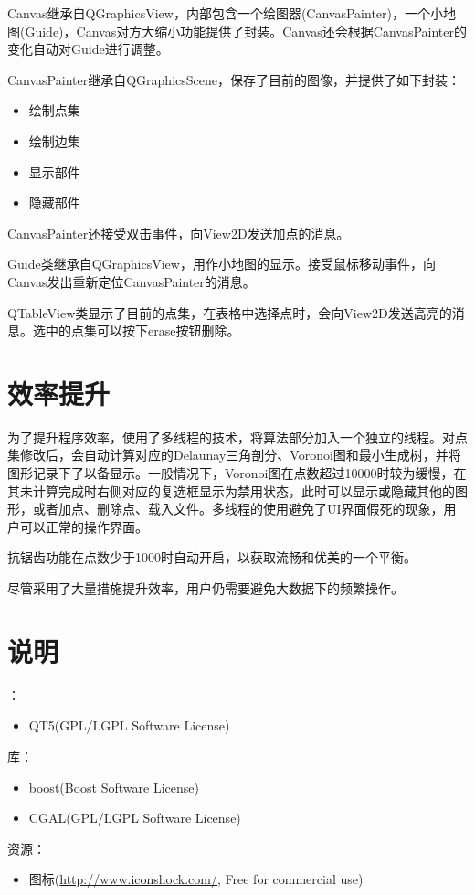 \documentclass[12pt]{article}
\begin{document}
Canvas继承自QGraphicsView，内部包含一个绘图器(CanvasPainter)，一个小地图(Guide)，Canvas对方大缩小功能提供了封装。Canvas还会根据CanvasPainter的变化自动对Guide进行调整。

CanvasPainter继承自QGraphicsScene，保存了目前的图像，并提供了如下封装：
\begin{itemize}
\item 绘制点集
\item 绘制边集
\item 显示部件
\item 隐藏部件
\end{itemize}
CanvasPainter还接受双击事件，向View2D发送加点的消息。

Guide类继承自QGraphicsView，用作小地图的显示。接受鼠标移动事件，向Canvas发出重新定位CanvasPainter的消息。

QTableView类显示了目前的点集，在表格中选择点时，会向View2D发送高亮的消息。选中的点集可以按下erase按钮删除。

\section{效率提升}
为了提升程序效率，使用了多线程的技术，将算法部分加入一个独立的线程。对点集修改后，会自动计算对应的Delaunay三角剖分、Voronoi图和最小生成树，并将图形记录下了以备显示。一般情况下，Voronoi图在点数超过10000时较为缓慢，在其未计算完成时右侧对应的复选框显示为禁用状态，此时可以显示或隐藏其他的图形，或者加点、删除点、载入文件。多线程的使用避免了UI界面假死的现象，用户可以正常的操作界面。

抗锯齿功能在点数少于1000时自动开启，以获取流畅和优美的一个平衡。

尽管采用了大量措施提升效率，用户仍需要避免大数据下的频繁操作。

\section{说明}
：
\begin{itemize}
\item QT5(GPL/LGPL Software License)
\end{itemize}
库：
\begin{itemize}
\item boost(Boost Software License)
\item CGAL(GPL/LGPL Software License)
\end{itemize}
资源：
\begin{itemize}
\item 图标(\href{http://www.iconshock.com/}{http://www.iconshock.com/}, Free for commercial use)
\end{itemize}
\end{document}
